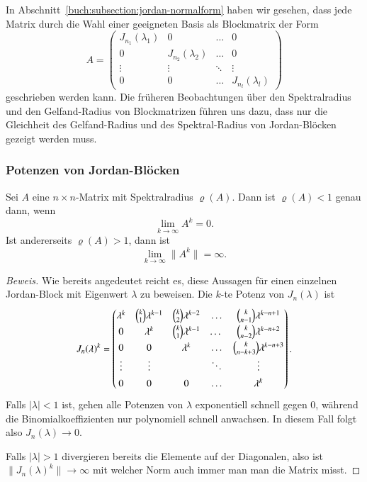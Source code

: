 In Abschnitt~\ref{buch:subsection:jordan-normalform}
haben wir gesehen, dass jede Matrix durch die Wahl
%
einer geeigneten Basis als Blockmatrix der Form
\[
A
=
\begin{pmatrix}
J_{n_1}(\lambda_1) &        0         & \dots & 0 \\
       0         & J_{n_2}(\lambda_2) & \dots & 0 \\[-4pt]
\vdots           &\vdots            &\ddots &\vdots \\
       0         &        0         & \dots &J_{n_l}(\lambda_l)
\end{pmatrix}
\]
geschrieben werden kann.
Die früheren Beobachtungen über den Spektralradius und den
Gelfand-Radius von Blockmatrizen führen uns dazu, 
dass nur die Gleichheit des Gelfand-Radius
und des Spektral-Radius von Jordan-Blöcken gezeigt werden muss.

\subsubsection{Potenzen von Jordan-Blöcken}
\begin{satz}
\label{buch:spektralradius:satz:grenzwert}
Sei $A$ eine $n\times n$-Matrix mit Spektralradius $\varrho(A)$.
Dann ist $\varrho(A)<1$ genau dann, wenn
\[
\lim_{k\to\infty} A^k = 0.
\]
Ist andererseits $\varrho(A) > 1$, dann ist
\[
\lim_{k\to\infty} \|A^k\|=\infty.
\]
\end{satz}

\begin{proof}[Beweis]
Wie bereits angedeutet reicht es, diese Aussagen für einen einzelnen
Jordan-Block mit Eigenwert $\lambda$ zu beweisen.
Die $k$-te Potenz von $J_n(\lambda)$ ist
\[
J_n(\lambda)^k
=
\renewcommand\arraystretch{1.35}
\begin{pmatrix}
\lambda^k    & \binom{k}{1} \lambda^{k-1} & \binom{k}{2}\lambda^{k-2}&\dots&
\binom{k}{n-1}\lambda^{k-n+1}\\
      0      &\lambda^k & \binom{k}{1} \lambda^{k-1} & \dots &\binom{k}{n-2}\lambda^{k-n+2}\\
      0     &      0    & \lambda^k & \dots &\binom{k}{n-k+3}\lambda^{k-n+3}\\
\vdots      & \vdots    &               &\ddots & \vdots\\
     0      &      0    &      0        &\dots  &\lambda^k
\end{pmatrix}.
\]
Falls $|\lambda| < 1$ ist, gehen alle Potenzen von $\lambda$ exponentiell
schnell gegen $0$, während die Binomialkoeffizienten nur polynomiell
schnell anwachsen. 
%
In diesem Fall folgt also $J_n(\lambda)\to 0$.

Falls $|\lambda| >1$ divergieren bereits die Elemente auf der Diagonalen,
also ist $\|J_n(\lambda)^k\|\to\infty$ mit welcher Norm auch immer man
man die Matrix misst.
\end{proof}

